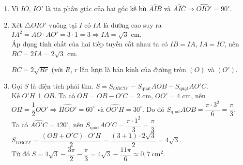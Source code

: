 \begin{bt}
{		\begin{enumerate}
			\item Vì $IO$, $IO'$ là tia phân giác của hai góc kề bù $\widehat{AIB}$ và $\widehat{AIC} \Rightarrow \widehat{OIO'} = 90^\circ$.
			\item Xét $\triangle OIO'$ vuông tại $I$ có $IA$ là đường cao suy ra
			$IA^2 = AO\cdot AO'= 3\cdot 1 = 3\Rightarrow IA = \sqrt{3}$ cm.\\
			Áp dụng tính chất của hai tiếp tuyến cắt nhau ta có $IB = IA$, $IA = IC$, nên $BC = 2IA = 2\sqrt{3}$ cm.
			\begin{note}
				$BC = 2\sqrt{Rr}$ (với $R$, $r$ lần lượt là bán kính của đường tròn $(O)$ và $(O')$.
			\end{note}
			\item Gọi $S$ là diện tích phải tìm.
			$S = S_{OBCO'} - S_\text{quạt}{AOB} - S_\text{quạt}{AO'C}$.\\
			Kẻ $O'H \perp OB$.
			Ta có $OH = OB - O'C = 2$ cm, $OO' = 4$ cm, nên $OH = \dfrac{1}{2}OO' \Rightarrow \widehat{HOO'} = 60^\circ$ và $\widehat{OO'H} = 30^\circ$. Do đó $S_\text{quạt}{AOB} = \dfrac{\pi \cdot 3^2}{6}=\dfrac{\pi}{3}$.\\
			Ta có $\widehat{AO'C} = 120^\circ$, nên $S_\text{quạt}{AO'C} = \dfrac{\pi\cdot 1^2}{3} = \dfrac{\pi}{3}$.
			\\ 
			$S_{OBCO'}=\dfrac{(OB + O'C)\cdot O'H}{2} = \dfrac{(3+1)\cdot 2\sqrt{3}}{2} = 4\sqrt{3}$.\\
			Từ đó $S = 4\sqrt{3} - \dfrac{3\pi}{2} - \dfrac{\pi}{3} = 4\sqrt{3} - \dfrac{11\pi}{6} \approx 0{,}7\  \text{cm}^2$.
			
		\end{enumerate}
		
	}
	
\end{bt}

